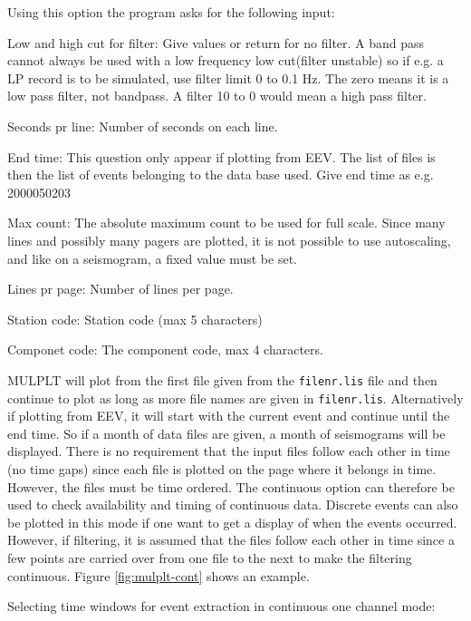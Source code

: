 Using this option the program asks for the following input: 

Low and high cut for filter: Give values or return for no filter. A band pass cannot always be used with a low frequency low cut(filter unstable) so if e.g. a LP record is to be simulated, use filter limit 0 to 0.1 Hz. The zero means it is a low pass filter, not bandpass. A filter 10 to 0 would mean a high pass filter.  

Seconds pr line: Number of seconds on each line. 

End time: This question only appear if plotting from EEV. The list of files is then the list of events belonging to the data base used. Give end time as e.g. 2000050203 

Max count: The absolute maximum count to be used for full scale. Since many lines and possibly many pagers are plotted, it is not possible to use autoscaling, and like on a seismogram, a fixed value must be set. 

Lines pr page: Number of lines per page. 

Station code: Station code (max 5 characters) 

Componet code: The component code, max 4 characters. 

MULPLT will plot from the first file given from the \texttt{filenr.lis} file and then continue to plot as long as more file names are given in \texttt{filenr.lis}. Alternatively if plotting from EEV, it will start with the current event and continue until the end time. So if a month of data files are given, a month of seismograms will be displayed. There is no requirement that the input files follow each other in time (no time gaps) since each file is plotted on the page where it belongs in time. However, the files must be time ordered. The continuous option can therefore be used to check availability and timing of continuous data. Discrete events can also be plotted in this mode if one want to get a display of when the events occurred. However, if filtering, it is assumed that the files follow each other in time since a few points are carried over from one file to the next to make the filtering continuous. 
Figure 
\ref{fig:mulplt-cont}
shows an example. 

Selecting time windows for event extraction in continuous one channel mode: 
\label{page:mulplt.ext}


